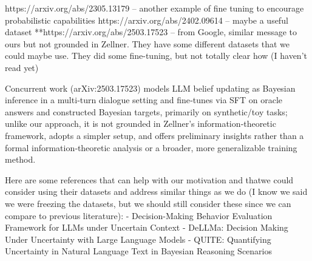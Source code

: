 https://arxiv.org/abs/2305.13179 – another example of fine tuning to encourage probabilistic capabilities
https://arxiv.org/abs/2402.09614 – maybe a useful dataset
**https://arxiv.org/abs/2503.17523 – from Google, similar message to ours but not grounded in Zellner. They have some different datasets that we could maybe use. They did some fine-tuning, but not totally clear how (I haven’t read yet)

Concurrent work (arXiv:2503.17523) models LLM belief updating as Bayesian inference in a multi‑turn dialogue setting and fine‑tunes via SFT on oracle answers and constructed Bayesian targets, primarily on synthetic/toy tasks; unlike our approach, it is not grounded in Zellner’s information‑theoretic framework, adopts a simpler setup, and offers preliminary insights rather than a formal information‑theoretic analysis or a broader, more generalizable training method.



Here are some references that can help with our motivation and thatwe could consider using their datasets and address similar things as we do (I know we said we were freezing the datasets, but we should still consider these since we can compare to previous literature):
- Decision-Making Behavior Evaluation Framework for LLMs under Uncertain Context
- DeLLMa: Decision Making Under Uncertainty with Large Language Models
- QUITE: Quantifying Uncertainty in Natural Language Text in Bayesian Reasoning Scenarios